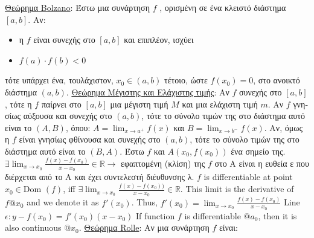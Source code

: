 \documentclass[12pt]{article}
\def\Dom{\text{Dom\ }} %
\begin{document}
\begin{flushleft}
	\textbullet \quad \uline{\textgreek{Θεώρημα} Bolzano}: \textgreek{Έστω μια συνάρτηση} $f$ \textgreek{, ορισμένη σε ένα κλειστό διάστημα} $[a,b]$. \textgreek{Αν}:
	\begin{itemize}
			\renewcommand{\labelitemi}{$\rightarrow$}
	\item \textgreek{η} $f$ \textgreek{είναι συνεχής στο} $[a,b]$ \textgreek{και επιπλέον, ισχύει} 
	\item $f(a) \cdot f(b) < 0$
	\end{itemize}
	\textgreek{τότε υπάρχει ένα, τουλάχιστον,} $x_0 \in (a,b)$ \textgreek{τέτοιο, ώστε} $f(x_0) = 0$, \textgreek{στο ανοικτό διάστημα} $(a,b)$. \linebreak 
	\textbullet \quad \textgreek{\uline{Θεώρημα Μέγιστης και Ελάχιστης τιμής}: Αν} $f$ \textgreek{συνεχής  στο} $[a,b]$, \textgreek{τότε η} $f$ \textgreek{παίρνει στο} $[a,b]$ \textgreek{μια μέγιστη τιμή} $M$ \textgreek{και μια ελάχιστη τιμή} $m$. \linebreak 
	\textbullet \quad \textgreek{Αν} $f$ \textgreek{γνησίως αύξουσα και συνεχής στο} $(a,b)$, \textgreek{τότε το σύνολο τιμών της στο διάστημα αυτό είναι το} $(A,B)$, \textgreek{όπου}: $\displaystyle A = \lim_{x\to a^+} f(x)$ \textgreek{και} $\displaystyle B= \lim_{x\to b^-} f(x)$. \linebreak \textgreek{Αν, όμως η} $f$ \textgreek{είναι γνησίως φθίνουσα και συνεχής στο} $(a,b)$, \textgreek{τότε το σύνολο τιμών της στο διάστημα αυτό είναι το} $(B,A)$. \linebreak 
	\textbullet \quad \textgreek{Έστω} $f$ \textgreek{και} $A(x_0, f(x_0))$ \textgreek{ένα σημείο της}. $\displaystyle \exists \lim_{x\to x_0} \frac{f(x)-f(x_0)}{x-x_0} \in \mathbb{R} \rightarrow$ \textgreek{εφαπτομένη (κλίση) της} $f$ \textgreek{στο Α είναι η ευθεία ε που διέρχεται από το Α και έχει συντελεστή διέυθυνσης λ}. \linebreak 
	\textbullet \quad $f$ is differentiable at point $x_0 \in \Dom(f)$, iff $\displaystyle \exists \lim_{x\to x_0} \frac{f(x)-f(x_0))}{x-x_0} \in \mathbb{R}$. This limit is the derivative of $f @ x_0$ and we denote it as $f'(x_0)$. Thus, $\displaystyle f'(x_0) = \lim_{x\to x_0} \frac{f(x)-f(x_0)}{x-x_0} $ \linebreak 
	\textbullet \quad Line $\displaystyle \epsilon: y -f(x_0) = f'(x_0) (x-x_0)$ \linebreak 
	\textbullet \quad If function $f$ is differentiable $@ a_0$, then it is also continuous $@ x_0$. \linebreak 
	\textbullet \quad \uline{\textgreek{Θεώρημα} Rolle}: \textgreek{Αν μια συνάρτηση} $f$ \textgreek{είναι}:  

\end{flushleft}
\end{document}
